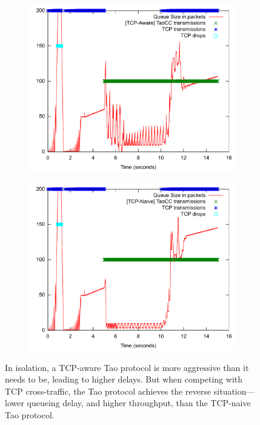 \begin{figure}
\centering
\begin{subfigure}[b]{0.4\textwidth}
\includegraphics[width=\textwidth]{tx-queue-aware.pdf}
\end{subfigure}
\begin{subfigure}[b]{0.4\textwidth}
\includegraphics[width=\textwidth]{tx-queue-naive.pdf}
\end{subfigure}
\caption{In isolation, a TCP-aware Tao protocol is more aggressive than it needs to be, leading to higher delays. But when competing with TCP cross-traffic, the Tao protocol achieves the reverse situation---lower queueing delay, and higher throughput, than the TCP-naive Tao protocol.}
\label{fig:explain}
\end{figure}


